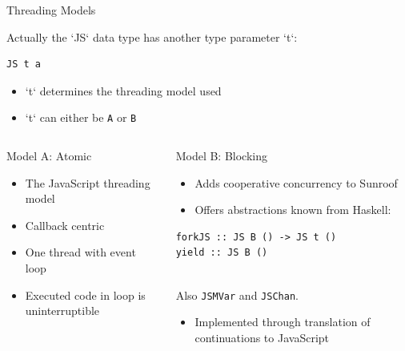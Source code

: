 \documentclass{beamer}
\begin{document}
\begin{frame}[fragile]{Threading Models}

Actually the `JS` data type has another type parameter `t`:

\begin{codeblock}[0.15]
\small
\begin{verbatim}
JS t a
\end{verbatim}
\end{codeblock}

\begin{itemize}
\item `t` determines the threading model used
\item `t` can either be \verb`A` or \verb`B`
\end{itemize}

\begin{columns}
\begin{column}{0.5\textwidth}
Model A: Atomic
\begin{itemize}
\item The JavaScript threading model
\item Callback centric
\item One thread with event loop
\item Executed code in loop is uninterruptible
\end{itemize}
\end{column}
\begin{column}{0.5\textwidth}
Model B: Blocking

\begin{itemize}
\item Adds cooperative concurrency to Sunroof
\item Offers abstractions known from Haskell: 
\end{itemize}

\begin{codeblock}[0.6]
\begin{verbatim}
forkJS :: JS B () -> JS t ()
yield :: JS B ()
\end{verbatim}
\end{codeblock}

~\\
Also \verb|JSMVar| and \verb|JSChan|.

\begin{itemize}
\item Implemented through translation of continuations to JavaScript
\end{itemize}

\end{column}
\end{columns}

\end{frame}
\end{document}
